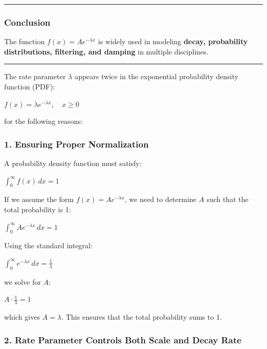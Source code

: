 \documentclass[11pt]{article}
\begin{document}
\begin{center}\rule{0.5\linewidth}{0.5pt}\end{center}

\subsubsection{\texorpdfstring{\textbf{Conclusion}}{Conclusion}}\label{conclusion}

The function \(f(x) = A e^{-\lambda x}\) is widely used in modeling
\textbf{decay, probability distributions, filtering, and damping} in
multiple disciplines.

\begin{center}\rule{0.5\linewidth}{0.5pt}\end{center}

The rate parameter \(\lambda\) appears twice in the exponential
probability density function (PDF):

\(f(x) = \lambda e^{-\lambda x}, \quad x \geq 0\)

for the following reasons:

\subsubsection{\texorpdfstring{\textbf{1. Ensuring Proper
Normalization}}{1. Ensuring Proper Normalization}}\label{ensuring-proper-normalization}

A probability density function must satisfy:

\(\int_0^{\infty} f(x) \,dx = 1\)

If we assume the form \(f(x) = A e^{-\lambda x}\), we need to determine
\(A\) such that the total probability is 1:

\(\int_0^{\infty} A e^{-\lambda x} \,dx = 1\)

Using the standard integral:

\(\int_0^{\infty} e^{-\lambda x} \,dx = \frac{1}{\lambda}\)

we solve for \(A\):

\(A \cdot \frac{1}{\lambda} = 1\)

which gives \(A = \lambda\). This ensures that the total probability
sums to 1.

\subsubsection{\texorpdfstring{\textbf{2. Rate Parameter Controls Both
Scale and Decay
Rate}}{2. Rate Parameter Controls Both Scale and Decay Rate}}\label{rate-parameter-controls-both-scale-and-decay-rate}
\end{document}
